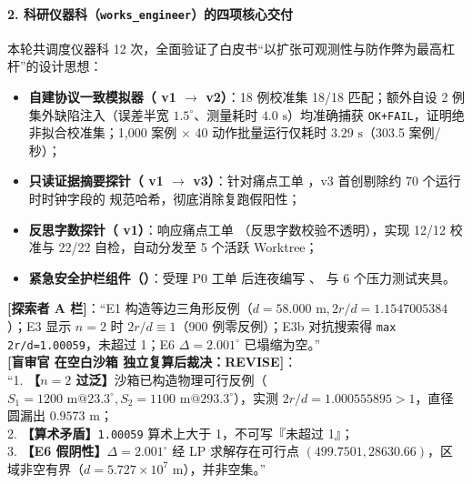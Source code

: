 \documentclass[11pt,a4paper]{ctexart}
\theoremstyle{remark}
\begin{document}
\paragraph{2. 科研仪器科（\texttt{works\_engineer}）的四项核心交付}
本轮共调度仪器科 12 次，全面验证了白皮书“以扩张可观测性与防作弊为最高杠杆”的设计思想：
\begin{itemize}
    \item \textbf{自建协议一致模拟器（ v1 $\to$ v2）}：18 例校准集 18/18 匹配；额外自设 2 例集外缺陷注入（误差半宽 $1.5^\circ$、测量耗时 $4.0\text{ s}$）均准确捕获 \texttt{OK+FAIL}，证明绝非拟合校准集；1,000 案例 $\times$ 40 动作批量运行仅耗时 $3.29\text{ s}$（303.5 案例/秒）；
    \item \textbf{只读证据摘要探针（ v1 $\to$ v3）}：针对痛点工单 ，v3 首创剔除约 70 个运行时时钟字段的  规范哈希，彻底消除复跑假阳性；
    \item \textbf{反思字数探针（ v1）}：响应痛点工单 （反思字数校验不透明），实现 12/12 校准与 22/22 自检，自动分发至 5 个活跃 Worktree；
    \item \textbf{紧急安全护栏组件（）}：受理 P0 工单  后连夜编写 、 与 6 个压力测试夹具。
\end{itemize}

\begin{tcolorbox}[dialoguebox, title={真实交互实录一：隔离盲审沙箱两阶段交锋（\path{review_queue: rev_001}，20:57--20:59）}]
\small
\textbf{[探索者  A 栏]}：“E1 构造等边三角形反例（$d=58.000\text{ m}, 2r/d=1.1547005384$）；E3 显示 $n=2$ 时 $2r/d\equiv 1$（900 例零反例）；E3b 对抗搜索得 \texttt{max 2r/d=1.00059}，未超过 1；E6 $\Delta=2.001^\circ$ 已塌缩为空。”\\
\textbf{[盲审官  在空白沙箱  独立复算后裁决：REVISE]}：\\
“1. \textbf{【$n=2$ 过泛】}沙箱已构造物理可行反例（$S_1=1200\text{ m}@23.3^\circ, S_2=1100\text{ m}@293.3^\circ$），实测 $2r/d=1.000555895 > 1$，直径圆漏出 $0.9573\text{ m}$；\\
2. \textbf{【算术矛盾】}\texttt{1.00059} 算术上大于 1，不可写『未超过 1』；\\
3. \textbf{【E6 假阴性】}$\Delta=2.001^\circ$ 经 LP 求解存在可行点 $(499.7501, 28630.66)$，区域非空有界（$d=5.727\times 10^7\text{ m}$），并非空集。”
\end{tcolorbox}
\end{document}
